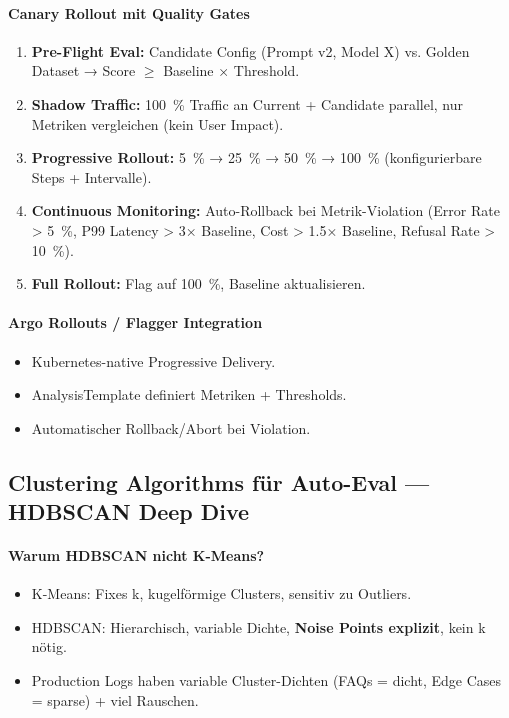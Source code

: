 \paragraph{Canary Rollout mit Quality Gates}
\begin{enumerate}
    \item \textbf{Pre-Flight Eval:} Candidate Config (Prompt v2, Model X) vs. Golden Dataset → Score $\ge$ Baseline × Threshold.
    \item \textbf{Shadow Traffic:} 100~\% Traffic an Current + Candidate parallel, nur Metriken vergleichen (kein User Impact).
    \item \textbf{Progressive Rollout:} 5~\% → 25~\% → 50~\% → 100~\% (konfigurierbare Steps + Intervalle).
    \item \textbf{Continuous Monitoring:} Auto-Rollback bei Metrik-Violation (Error Rate > 5~\%, P99 Latency > 3× Baseline, Cost > 1.5× Baseline, Refusal Rate > 10~\%).
    \item \textbf{Full Rollout:} Flag auf 100~\%, Baseline aktualisieren.
\end{enumerate}

\paragraph{Argo Rollouts / Flagger Integration}
\begin{itemize}
    \item Kubernetes-native Progressive Delivery.
    \item AnalysisTemplate definiert Metriken + Thresholds.
    \item Automatischer Rollback/Abort bei Violation.
\end{itemize}


\subsection{Clustering Algorithms für Auto-Eval — HDBSCAN Deep Dive}

\paragraph{Warum HDBSCAN nicht K-Means?}
\begin{itemize}
    \item K-Means: Fixes k, kugelförmige Clusters, sensitiv zu Outliers.
    \item HDBSCAN: Hierarchisch, variable Dichte, \textbf{Noise Points explizit}, kein k nötig.
    \item Production Logs haben variable Cluster-Dichten (FAQs = dicht, Edge Cases = sparse) + viel Rauschen.
\end{itemize}

